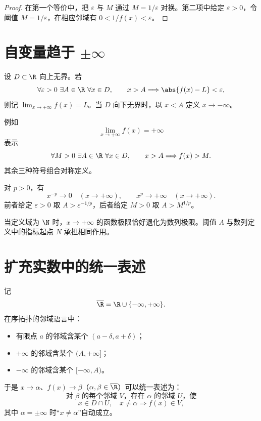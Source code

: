 \begin{proof}
在第一个等价中，把 \(\varepsilon\) 与 \(M\) 通过 \(M=1/\varepsilon\) 对换。第二项中给定 \(\varepsilon>0\)，令阈值 \(M=1/\varepsilon\)，在相应邻域有 \(0<1/f(x)<\varepsilon\)。
\end{proof}

\section{自变量趋于 \texorpdfstring{\(\pm\infty\)}{infinity}}

\begin{definition}[无穷远处的有限极限]
设 \(D\subset\R\) 向上无界。若
\[
 \forall\varepsilon>0\ \exists A\in\R\ \forall x\in D,\qquad
 x>A\Longrightarrow\abs{f(x)-L}<\varepsilon,
\]
则记 \(\lim_{x\to+\infty}f(x)=L\)。当 \(D\) 向下无界时，以 \(x<A\) 定义 \(x\to-\infty\)。
\end{definition}

\begin{definition}[无穷远处的无穷极限]
例如
\[
 \lim_{x\to+\infty}f(x)=+\infty
\]
表示
\[
 \forall M>0\ \exists A\in\R\ \forall x\in D,\qquad
 x>A\Longrightarrow f(x)>M.
\]
其余三种符号组合对称定义。
\end{definition}

\begin{example}
对 \(p>0\)，有
\[
 x^{-p}\to0\quad(x\to+\infty),\qquad
 x^p\to+\infty\quad(x\to+\infty).
\]
前者给定 \(\varepsilon>0\) 取 \(A>\varepsilon^{-1/p}\)，后者给定 \(M>0\) 取 \(A>M^{1/p}\)。
\end{example}

当定义域为 \(\N\) 时，\(x\to+\infty\) 的函数极限恰好退化为数列极限。阈值 \(A\) 与数列定义中的指标起点 \(N\) 承担相同作用。

\section{扩充实数中的统一表述}

记
\[
 \overline{\R}=\R\cup\{-\infty,+\infty\}.
\]
在序拓扑的邻域语言中：
\begin{itemize}
 \item 有限点 \(a\) 的邻域含某个 \((a-\delta,a+\delta)\)；
 \item \(+\infty\) 的邻域含某个 \((A,+\infty]\)；
 \item \(-\infty\) 的邻域含某个 \([-\infty,A)\)。
\end{itemize}
于是 \(x\to\alpha\)、\(f(x)\to\beta\)（\(\alpha,\beta\in\overline{\R}\)）可以统一表述为：
\[
 \text{对 \(\beta\) 的每个邻域 \(V\)，存在 \(\alpha\) 的邻域 \(U\)，使}
\]
\[
 x\in D\cap U,\quad x\ne\alpha
 \Longrightarrow f(x)\in V,
\]
其中 \(\alpha=\pm\infty\) 时“\(x\ne\alpha\)”自动成立。

